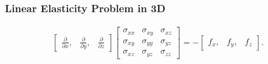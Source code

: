 \documentclass[screen]{beamer}
\begin{document}
\begin{frame}
\frametitle{Linear Elasticity Problem in 3D}
\begin{align*}
\begin{bmatrix}
\frac{\partial}{\partial x}, & \frac{\partial}{\partial y}, & \frac{\partial}{\partial z}
\end{bmatrix}
\begin{bmatrix}
\sigma_{xx} & \sigma_{xy} & \sigma_{xz} \\
\sigma_{xy} & \sigma_{yy} & \sigma_{yz} \\
\sigma_{xz} & \sigma_{yz} & \sigma_{zz}
\end{bmatrix} = -
\begin{bmatrix}
f_x, & f_y, & f_z 
\end{bmatrix}.
\end{align*}
\end{frame}
\end{document}
